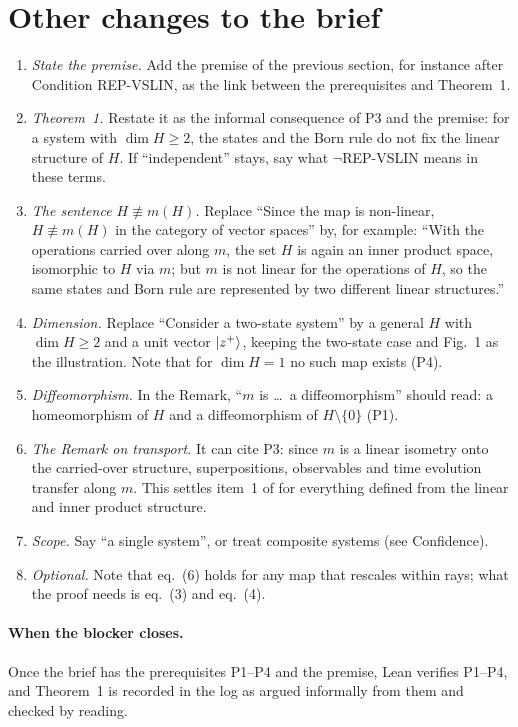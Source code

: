 \documentclass[11pt]{article}
\begin{document}
\section{Other changes to the brief}
\begin{enumerate}
\item \emph{State the premise.} Add the premise of the previous section, for instance after
  Condition REP-VSLIN, as the link between the prerequisites and Theorem~1.
\item \emph{Theorem~1.} Restate it as the informal consequence of P3 and the premise: for a
  system with $\dim H \ge 2$, the states and the Born rule do not fix the linear structure of
  $H$. If ``independent'' stays, say what $\neg$REP-VSLIN means in these terms.
\item \emph{The sentence $H \not\equiv m(H)$.} Replace ``Since the map is non-linear,
  $H \not\equiv m(H)$ in the category of vector spaces'' by, for example: ``With the operations
  carried over along $m$, the set $H$ is again an inner product space, isomorphic to $H$ via
  $m$; but $m$ is not linear for the operations of $H$, so the same states and Born rule are
  represented by two different linear structures.''
\item \emph{Dimension.} Replace ``Consider a two-state system'' by a general $H$ with
  $\dim H \ge 2$ and a unit vector $\ket{z^+}$, keeping the two-state case and Fig.~1 as the
  illustration. Note that for $\dim H = 1$ no such map exists (P4).
\item \emph{Diffeomorphism.} In the Remark, ``$m$ is \ldots\ a diffeomorphism'' should read:
  a homeomorphism of $H$ and a diffeomorphism of $H \setminus \{0\}$ (P1).
\item \emph{The Remark on transport.} It can cite P3: since $m$ is a linear isometry onto the
  carried-over structure, superpositions, observables and time evolution transfer along $m$.
  This settles item~1 of  for everything defined from the linear and
  inner product structure.
\item \emph{Scope.} Say ``a single system'', or treat composite systems (see Confidence).
\item \emph{Optional.} Note that eq.~(6) holds for any map that rescales within rays; what the
  proof needs is eq.~(3) and eq.~(4).
\end{enumerate}

\paragraph{When the blocker closes.} Once the brief has the prerequisites P1--P4 and the
premise, Lean verifies P1--P4, and Theorem~1 is recorded in the log as argued informally from
them and checked by reading.
\end{document}
